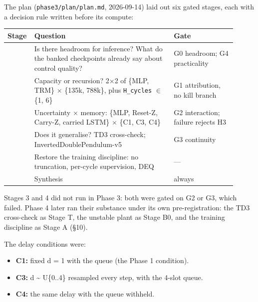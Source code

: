 \documentclass[11pt]{article}
\begin{document}
The plan (\texttt{phase3/\allowbreak{}plan/\allowbreak{}plan.\allowbreak{}md}, 2026-09-14) laid out six gated stages, each with a decision rule written before its compute:



\begin{center}\small\begin{tabular}{>{\raggedright\arraybackslash}p{0.063\linewidth}>{\raggedright\arraybackslash}p{0.581\linewidth}>{\raggedright\arraybackslash}p{0.262\linewidth}}
\toprule
Stage & Question & Gate \\
\midrule
0 & Is there headroom for inference? What do the banked checkpoints already say about control quality? & G0 headroom; G4 practicality \\
1 & Capacity or recursion? 2$\times$2 of \{MLP, TRM\} $\times$ \{135k, 788k\}, plus \texttt{H\_cycles} $\in$ \{1, 6\} & G1 attribution, no kill branch \\
2 & Uncertainty $\times$ memory: \{MLP, Reset-Z, Carry-Z, carried LSTM\} $\times$ \{C1, C3, C4\} & G2 interaction; failure rejects H3 \\
3 & Does it generalise? TD3 cross-check; InvertedDoublePendulum-v5 & G3 continuity \\
4 & Restore the training discipline: no truncation, per-cycle supervision, DEQ & --- \\
5 & Synthesis & always \\
\bottomrule
\end{tabular}\end{center}



Stages 3 and 4 did not run in Phase 3: both were gated on G2 or G3, which failed. Phase 4 later ran their substance under its own pre-registration: the TD3 cross-check as Stage T, the unstable plant as Stage B0, and the training discipline as Stage A (\S{}10).



The delay conditions were:

\begin{itemize}
\item \textbf{C1:} fixed d = 1 with the queue (the Phase 1 condition).
\item \textbf{C3:} d \textasciitilde{} U\{0..4\} resampled every step, with the 4-slot queue.
\item \textbf{C4:} the same delay with the queue withheld.
\end{itemize}
\end{document}
